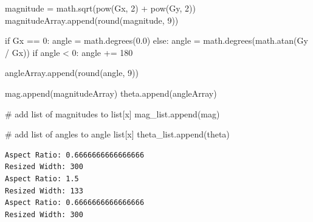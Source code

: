 \documentclass[
  letterpaper,
  DIV=11,
  numbers=noendperiod]{scrreprt}
\newenvironment{Shaded}{\begin{snugshade}}{\end{snugshade}}
\newcommand{\BuiltInTok}[1]{\textcolor[rgb]{0.00,0.23,0.31}{#1}}
\newcommand{\CommentTok}[1]{\textcolor[rgb]{0.37,0.37,0.37}{#1}}
\newcommand{\ControlFlowTok}[1]{\textcolor[rgb]{0.00,0.23,0.31}{#1}}
\newcommand{\DecValTok}[1]{\textcolor[rgb]{0.68,0.00,0.00}{#1}}
\newcommand{\FloatTok}[1]{\textcolor[rgb]{0.68,0.00,0.00}{#1}}
\newcommand{\NormalTok}[1]{\textcolor[rgb]{0.00,0.23,0.31}{#1}}
\newcommand{\OperatorTok}[1]{\textcolor[rgb]{0.37,0.37,0.37}{#1}}
\begin{document}
\begin{Shaded}
\begin{Highlighting}[]
\NormalTok{            magnitude }\OperatorTok{=}\NormalTok{ math.sqrt(}\BuiltInTok{pow}\NormalTok{(Gx, }\DecValTok{2}\NormalTok{) }\OperatorTok{+} \BuiltInTok{pow}\NormalTok{(Gy, }\DecValTok{2}\NormalTok{))}
\NormalTok{            magnitudeArray.append(}\BuiltInTok{round}\NormalTok{(magnitude, }\DecValTok{9}\NormalTok{))}

            \ControlFlowTok{if}\NormalTok{ Gx }\OperatorTok{==} \DecValTok{0}\NormalTok{:}
\NormalTok{                angle }\OperatorTok{=}\NormalTok{ math.degrees(}\FloatTok{0.0}\NormalTok{)}
            \ControlFlowTok{else}\NormalTok{:}
\NormalTok{                angle }\OperatorTok{=}\NormalTok{ math.degrees(math.atan(Gy }\OperatorTok{/}\NormalTok{ Gx))}
                \ControlFlowTok{if}\NormalTok{ angle }\OperatorTok{\textless{}} \DecValTok{0}\NormalTok{:}
\NormalTok{                    angle }\OperatorTok{+=} \DecValTok{180}

\NormalTok{            angleArray.append(}\BuiltInTok{round}\NormalTok{(angle, }\DecValTok{9}\NormalTok{))}

\NormalTok{        mag.append(magnitudeArray)}
\NormalTok{        theta.append(angleArray)}

    \CommentTok{\# add list of magnitudes to list[x]}
\NormalTok{    mag\_list.append(mag)}

    \CommentTok{\# add list of angles to angle list[x]}
\NormalTok{    theta\_list.append(theta)}
\end{Highlighting}
\end{Shaded}

\begin{verbatim}
Aspect Ratio: 0.6666666666666666
Resized Width: 300
Aspect Ratio: 1.5
Resized Width: 133
Aspect Ratio: 0.6666666666666666
Resized Width: 300
\end{verbatim}
\end{document}
